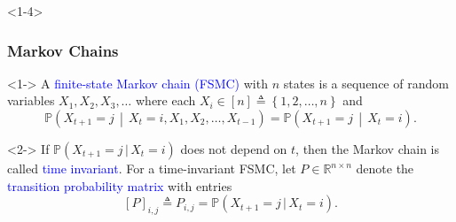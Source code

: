 \documentclass[10pt,english,aspectratio=169,handout]{beamer}
\renewcommand{\Pr}{\mathbb{P}}
\begin{document}
\begin{frame}<1-4> \frametitle{Markov Chains}

\begin{definition}<1->
A \textcolor{blue}{finite-state Markov chain (FSMC)} with $n$ states is a sequence of random variables $X_{1},X_{2},X_{3},\ldots$ where each $X_{i}\in[n]\triangleq\left\{ 1,2,\ldots,n\right\} $ and \vspace{-2mm}
\[
\Pr\left(X_{t+1}=j\,\middle|\,X_{t}=i,X_{1},X_{2},\ldots,X_{t-1}\right)=\Pr\left(X_{t+1}=j\,\middle|\,X_{t}=i\right).
\]
\end{definition}

\begin{definition}<2->
If $\Pr(X_{t+1}=j\,|\,X_{t}=i)$ does not depend on $t$, then the Markov chain is called \textcolor{blue}{time invariant}.
For a time-invariant FSMC, let $P\in\mathbb{R}^{n\times n}$ denote the \textcolor{blue}{transition probability matrix} with entries
\[\left[P\right]_{i,j}\triangleq P_{i,j}=\Pr(X_{t+1}=j\,|\,X_{t}=i).\]
\end{definition}

\vspace{2mm}


\end{frame}
\end{document}
